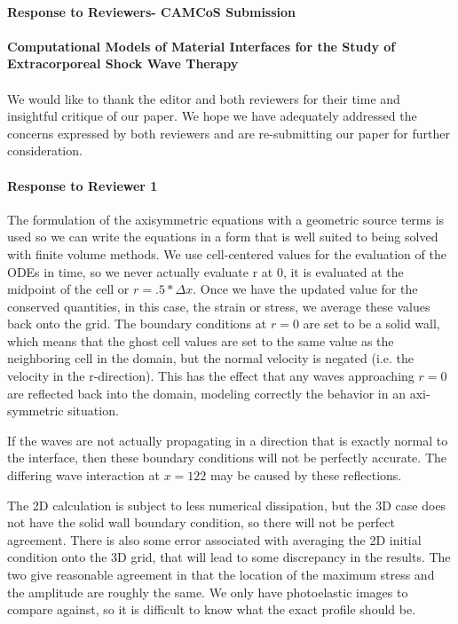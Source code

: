 \documentclass{report}
\begin{document}
\paragraph{Response to Reviewers- CAMCoS Submission} 
\paragraph{Computational Models of Material Interfaces for the Study of Extracorporeal Shock Wave Therapy}

\paragraph{}
We would like to thank the editor and both reviewers for their time and insightful critique of our paper.  We hope we have adequately addressed the concerns expressed by both reviewers and are re-submitting our paper for further consideration. 


\paragraph{Response to Reviewer 1}
The formulation of the axisymmetric equations with a geometric source terms is used so we can write the equations in a form that is well suited to being solved with finite volume methods.  We use cell-centered values for the evaluation of the ODEs in time, so we never actually evaluate r at 0, it is evaluated at the midpoint of the cell or $r=.5*\Delta x$.  Once we have the updated value for the conserved quantities, in this case, the strain or stress, we average these values back onto the grid.  The boundary conditions at $r=0$ are set to be a solid wall, which means that the ghost cell values are set to the same value as the neighboring cell in the domain, but the normal velocity is negated (i.e. the velocity in the r-direction).  This has the effect that any waves approaching $r=0$ are reflected back into the domain, modeling correctly the behavior in an axi-symmetric situation.

If the waves are not actually propagating in a direction that is exactly normal to the interface, then these boundary conditions will not be perfectly accurate.  The differing wave interaction at $x=122$ may be caused by these reflections.

The 2D calculation is subject to less numerical dissipation, but the 3D case does not have the solid wall boundary condition, so there will not be perfect agreement.  There is also some error associated with averaging the 2D initial condition onto the 3D grid, that will lead to some discrepancy in the results.  The two give reasonable agreement in that the location of the maximum stress and the amplitude are roughly the same.  We only have photoelastic images to compare against, so it is difficult to know what the exact profile should be. 
\end{document}
